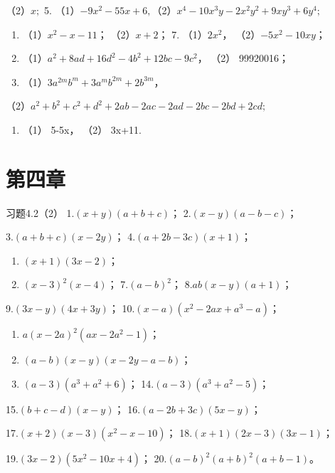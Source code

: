 （2）\(x;\) 5.
（1）\(-9x^{2} - 55x + 6,\)（2）\(x^{4} - 10x^{3}y - 2x^{2}y^{2} + 9xy^{3} + 6y^{4};\)

\begin{enumerate}[start=6]
\item
  （1）\(x^{2} - x - 11\)； （2）\(x + 2\)； 7. （1）\(2x^{2}\)，
  （2）\(-5x^{2} - 10xy\)；
\item
  （1）\(a^2 + 8ad + 16d^2 - 4b^2 + 12bc - 9c^2\)， （2） 99920016；
\item
  （1）\(3a^{2m}b^{m} + 3a^{m}b^{2m} + 2b^{3m}\)，
\end{enumerate}

（2）\(a^2 + b^2 + c^2 + d^2 + 2ab - 2ac - 2ad - 2bc - 2bd + 2cd;\)

\begin{enumerate}[start=10]
\item
  （1） 5-5x， （2） 3x+11.
\end{enumerate}

\section{第四章}

习题4.2（2） 1.\((x + y)(a + b + c)\)； 2.\((x - y)(a - b - c)\)；

3.\((a + b + c)(x - 2y)\)； 4.\((a + 2b - 3c)(x + 1)\)；
\begin{enumerate}[start=5]
\item
  \((x + 1)(3x - 2)\)；
\item
  \((x - 3)^{2}(x - 4)\)； 7.\((a - b)^{2}\)； 8.\(ab(x - y)(a + 1)\)；
\end{enumerate}

9.\((3x - y)(4x + 3y)\)； 10.\((x - a)(x^2 - 2ax + a^3 - a)\)；

\begin{enumerate}[start=11]
\item
  \(a(x - 2a)^{2}(ax - 2a^{2} - 1)\)；
\item
  \((a - b)(x - y)(x - 2y - a - b)\)；
\item
  \((a - 3)(a^3 + a^2 + 6)\)； 14.\((a - 3)(a^3 + a^2 - 5)\)；
\end{enumerate}

15.\((b + c - d)(x - y)\)； 16.\((a - 2b + 3c)(5x - y)\)；

17.\((x + 2)(x - 3)(x^2 - x - 10)\)； 18.\((x + 1)(2x - 3)(3x - 1)\)；

19.\((3x - 2)(5x^2 - 10x + 4)\)； 20.\((a - b)^2(a + b)^2(a + b - 1)\)。

